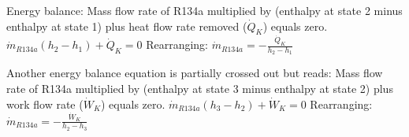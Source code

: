 Energy balance:  
Mass flow rate of R134a multiplied by (enthalpy at state 2 minus enthalpy at state 1) plus heat flow rate removed (\( \dot{Q}_K \)) equals zero.  
\( \dot{m}_{R134a} (h_2 - h_1) + \dot{Q}_K = 0 \)  
Rearranging:  
\( \dot{m}_{R134a} = - \frac{\dot{Q}_K}{h_2 - h_1} \)  

Another energy balance equation is partially crossed out but reads:  
Mass flow rate of R134a multiplied by (enthalpy at state 3 minus enthalpy at state 2) plus work flow rate (\( \dot{W}_K \)) equals zero.  
\( \dot{m}_{R134a} (h_3 - h_2) + \dot{W}_K = 0 \)  
Rearranging:  
\( \dot{m}_{R134a} = - \frac{\dot{W}_K}{h_2 - h_3} \)